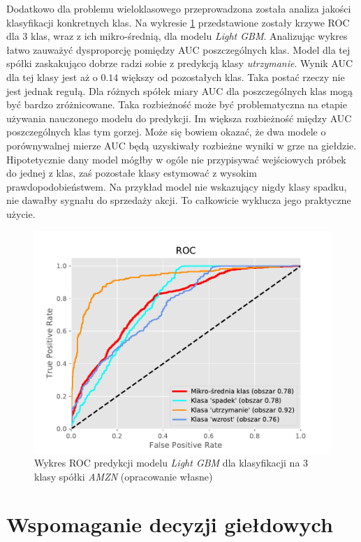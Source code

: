 \documentclass[a4paper, twoside, 11pt, openright]{article}
\begin{document}
Dodatkowo dla problemu wieloklasowego przeprowadzona została analiza jakości klasyfikacji konkretnych klas. Na wykresie \ref{img:lgbm_roc_amzn} przedstawione zostały krzywe ROC dla 3 klas, wraz z ich mikro-średnią, dla modelu \textit{Light GBM}. Analizując wykres łatwo zauważyć dysproporcję pomiędzy AUC poszczególnych klas. Model dla tej spółki zaskakująco dobrze radzi sobie z predykcją klasy \textit{utrzymanie}. Wynik AUC dla tej klasy jest aż o $0.14$ większy od pozostałych klas. Taka postać rzeczy nie jest jednak regułą. Dla różnych spółek miary AUC dla poszczególnych klas mogą być bardzo zróżnicowane. Taka rozbieżność może być problematyczna na etapie używania nauczonego modelu do predykcji. Im większa rozbieżność między AUC poszczególnych klas tym gorzej. Może się bowiem okazać, że dwa modele o porównywalnej mierze AUC będą uzyskiwały rozbieżne wyniki w grze na giełdzie. Hipotetycznie dany model mógłby w ogóle nie przypisywać wejściowych próbek do jednej z klas, zaś pozostałe klasy estymować z wysokim prawdopodobieństwem. Na przykład model nie wskazujący nigdy klasy spadku, nie dawałby sygnału do sprzedaży akcji. To całkowicie wyklucza jego praktyczne użycie.

\begin{figure}[H]
\centering \includegraphics[scale=0.8]{img/AMZN_roc_lgbm.pdf}
\caption{Wykres ROC predykcji modelu \textit{Light GBM} dla klasyfikacji na 3 klasy spółki \textit{AMZN} (opracowanie własne)}
\label{img:lgbm_roc_amzn}
\end{figure}

\newpage

\section{Wspomaganie decyzji giełdowych}
\end{document}
